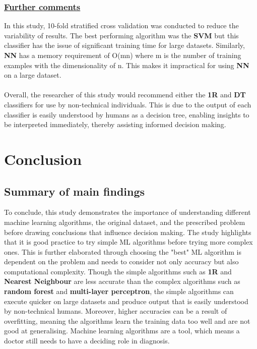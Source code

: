 \documentclass{article}
\begin{document}
    \subsubsection*{\underline{Further comments}}
    In this study, 10-fold stratified cross validation was conducted to reduce the variability of results. The best performing algorithm was the \textbf{SVM} but this classifier has the issue of significant training time for large datasets. Similarly, \textbf{NN} has a memory requirement of O(mn) where m is the number of training examples with the dimensionality of n. This makes it impractical for using \textbf{NN} on a large dataset.
    \\
    \\
    Overall, the researcher of this study would recommend either the \textbf{1R} and \textbf{DT} classifiers for use by non-technical individuals. This is due to the output of each classifier is easily understood by humans as a decision tree, enabling insights to be interpreted immediately, thereby assisting informed decision making.

    \section{Conclusion}
    \subsection{Summary of main findings}    
    To conclude, this study demonstrates the importance of understanding different machine learning algorithms, the original dataset, and the prescribed problem before drawing conclusions that influence decision making. The study highlights that it is good practice to try simple ML algorithms before trying more complex ones. This is further elaborated through choosing the "best" ML algorithm is dependent on the problem and needs to consider not only accuracy but also computational complexity. Though the simple algorithms such as \textbf{1R} and \textbf{Nearest Neighbour} are less accurate than the complex algorithms such as \textbf{random forest} and \textbf{multi-layer perceptron}, the simple algorithms can execute quicker on large datasets and produce output that is easily understood by non-technical humans. Moreover, higher accuracies can be a result of overfitting, meaning the algorithms learn the training data too well and are not good at generalising. Machine learning algorithms are a tool, which means a doctor still needs to have a deciding role in diagnosis.
\end{document}
